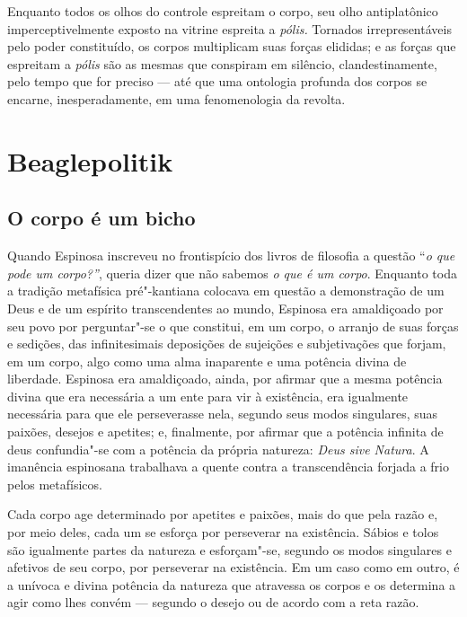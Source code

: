 Enquanto todos os olhos do controle espreitam o corpo, seu olho
antiplatônico imperceptivelmente exposto na vitrine espreita a
\emph{pólis. }Tornados irrepresentáveis pelo poder constituído, os
corpos multiplicam suas forças elididas; e as forças que espreitam a
\emph{pólis} são as mesmas que conspiram em silêncio, clandestinamente,
pelo tempo que for preciso --- até que uma ontologia profunda dos corpos
se encarne, inesperadamente, em uma fenomenologia da revolta.

\chapter{Beaglepolitik}


\section{O corpo é um bicho}

\textbf{}Quando Espinosa inscreveu no frontispício dos livros de
filosofia a questão ``\emph{o que pode um corpo?''}, queria dizer que
não sabemos \emph{o que é um corpo}. Enquanto toda a tradição metafísica
pré"-kantiana colocava em questão a demonstração de um Deus e de um
espírito transcendentes ao mundo, Espinosa era amaldiçoado por seu povo
por perguntar"-se o que constitui, em um corpo, o arranjo de suas forças
e sedições, das infinitesimais deposições de sujeições e subjetivações
que forjam, em um corpo, algo como uma alma inaparente e uma potência
divina de liberdade. Espinosa era amaldiçoado, ainda, por afirmar que a
mesma potência divina que era necessária a um ente para vir à
existência, era igualmente necessária para que ele perseverasse nela,
segundo seus modos singulares, suas paixões, desejos e apetites; e,
finalmente, por afirmar que a potência infinita de deus confundia"-se com
a potência da própria natureza: \emph{Deus sive Natura}. A imanência
espinosana trabalhava a quente contra a transcendência forjada a frio
pelos metafísicos.

Cada corpo age determinado por apetites e paixões, mais do que pela
razão e, por meio deles, cada um se esforça por perseverar na
existência. Sábios e tolos são igualmente partes da natureza e
esforçam"-se, segundo os modos singulares e afetivos de seu corpo, por
perseverar na existência. Em um caso como em outro, é a unívoca e divina
potência da natureza que atravessa os corpos e os determina a agir como
lhes convém --- segundo o desejo ou de acordo com a reta razão.

